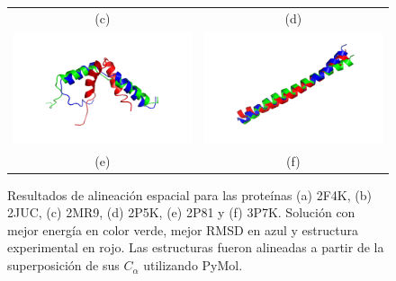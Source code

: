 \begin{figure}
\begin{tabular}{c c}
(c) & (d)\\
\includegraphics[width=8.5cm]{images/2P81.png} & \includegraphics[width=8.5cm]{images/3P7K.png} \\
(e) & (f)\\
\end{tabular}
\caption[Alineación espacial de estructuras extensas]{Resultados de alineación espacial para las proteínas (a) 2F4K, (b) 2JUC, (c) 2MR9, (d) 2P5K, (e) 2P81 y (f) 3P7K. Solución con mejor energía en color verde, mejor RMSD en azul y estructura experimental en rojo. Las estructuras fueron alineadas a partir de la superposición de sus $C_{\alpha}$ utilizando PyMol.}
\label{fig:prot-ext-1}
\end{figure}

